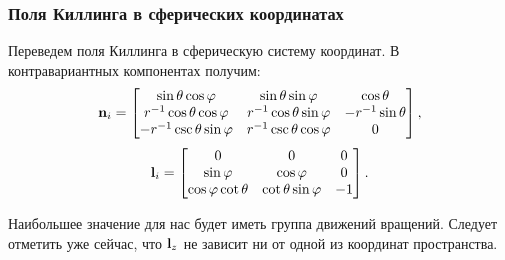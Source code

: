 \documentclass{beamer}
\begin{document}
    \begin{frame}\frametitle{Поля Киллинга в сферических координатах}

        Переведем поля Киллинга в сферическую систему координат. В контравариантных компонентах получим:
        \begin{equation}
            \mathbf{n}_i
            =
            \begin{bmatrix}
                \sin\theta \cos\varphi          & \sin\theta \sin\varphi        & \cos\theta \\
                r^{-1} \cos\theta \cos\varphi   & r^{-1} \cos\theta \sin\varphi & - r^{-1} \sin\theta \\
                - r^{-1} \csc\theta \sin\varphi & r^{-1} \csc\theta \cos\varphi & 0
            \end{bmatrix}
            ,
        \end{equation}
        \begin{equation}
            \mathbf{l}_i
            =
            \begin{bmatrix}
                0
                    & 0
                    & 0 \\
                \sin\varphi
                    & \cos\varphi
                    & 0 \\
                \cos\varphi \cot\theta
                    & \cot\theta \sin\varphi
                    & - 1
            \end{bmatrix}
            .
        \end{equation}

        Наибольшее значение для нас будет иметь группа движений вращений. Следует отметить уже сейчас, что $\mathbf{l}_z$ не зависит ни от одной из координат пространства.

    \end{frame}

\end{document}
